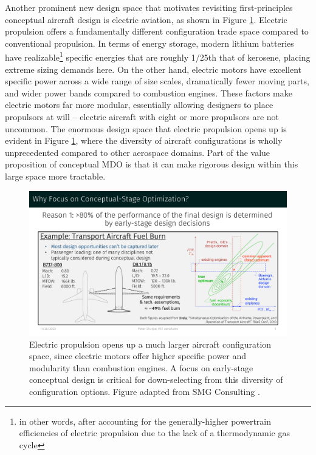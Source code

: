 Another prominent new design space that motivates revisiting first-principles conceptual aircraft design is electric aviation, as shown in Figure \ref{fig:motivation_2b}. Electric propulsion offers a fundamentally different configuration trade space compared to conventional propulsion. In terms of energy storage, modern lithium batteries have realizable\footnote{in other words, after accounting for the generally-higher powertrain efficiencies of electric propulsion due to the lack of a thermodynamic gas cycle} specific energies that are roughly 1/25th that of kerosene, placing extreme sizing demands here. On the other hand, electric motors have excellent specific power across a wide range of size scales, dramatically fewer moving parts, and wider power bands compared to combustion engines. These factors make electric motors far more modular, essentially allowing designers to place propulsors at will -- electric aircraft with eight or more propulsors are not uncommon. The enormous design space that electric propulsion opens up is evident in Figure \ref{fig:motivation_2b}, where the diversity of aircraft configurations is wholly unprecedented compared to other aerospace domains. Part of the value proposition of conceptual MDO is that it can make rigorous design within this large space more tractable.

\begin{figure}[H]
    \centering
    \includegraphics[page=4,trim=1cm 1.3cm 1cm 5cm, clip, width=\textwidth]{../figures/motivation_for_conceptual_MDO_focus.pdf}
    \caption{Electric propulsion opens up a much larger aircraft configuration space, since electric motors offer higher specific power and modularity than combustion engines. A focus on early-stage conceptual design is critical for down-selecting from this diversity of configuration options. Figure adapted from SMG Consulting \cite{aam_reality_index}.}
    \label{fig:motivation_2b}
\end{figure}

